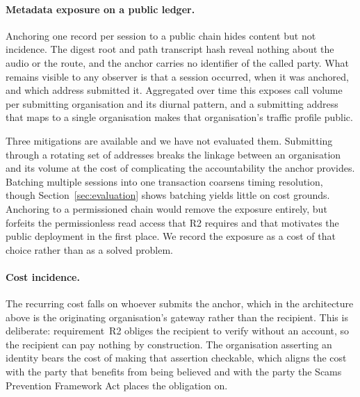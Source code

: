 \paragraph{Metadata exposure on a public ledger.}
Anchoring one record per session to a public chain hides content but not
incidence. The digest root and path transcript hash reveal nothing about the
audio or the route, and the anchor carries no identifier of the called party.
What remains visible to any observer is that a session occurred, when it was
anchored, and which address submitted it. Aggregated over time this exposes
call volume per submitting organisation and its diurnal pattern, and a
submitting address that maps to a single organisation makes that organisation's
traffic profile public.

Three mitigations are available and we have not evaluated them. Submitting
through a rotating set of addresses breaks the linkage between an organisation
and its volume at the cost of complicating the accountability the anchor
provides. Batching multiple sessions into one transaction coarsens timing
resolution, though Section~\ref{sec:evaluation} shows batching yields little on
cost grounds. Anchoring to a permissioned chain would remove the exposure
entirely, but forfeits the permissionless read access that R2 requires and that
motivates the public deployment in the first place. We record the exposure as a
cost of that choice rather than as a solved problem.


%

\paragraph{Cost incidence.}
The recurring cost falls on whoever submits the anchor, which in the
architecture above is the originating organisation's gateway rather than the
recipient. This is deliberate: requirement~R2 obliges the recipient to verify
without an account, so the recipient can pay nothing by construction. The
organisation asserting an identity bears the cost of making that assertion
checkable, which aligns the cost with the party that benefits from being
believed and with the party the Scams Prevention Framework Act places the
obligation on.

